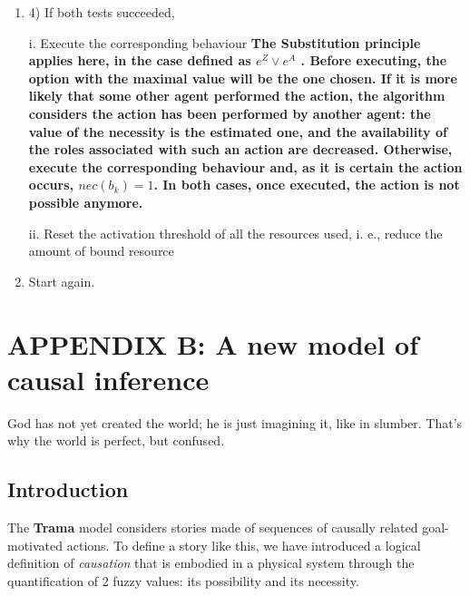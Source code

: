\documentclass[
		twoside,openright,titlepage,numbers=noenddot,manychapters,
		headinclude,%
                footinclude=false,cleardoublepage=empty,
                BCOR=5mm,
		fontsize=11pt, %
                 enabledeprecatedfontcommands]{scrreprt}
\begin{document}
\begin{enumerate}
  \item 4)	If both tests succeeded,

i.	Execute the corresponding behaviour \textbf{ The Substitution principle applies here, in the case defined as $e^Z \vee  e^{A} $ . Before executing, the option with the maximal value  will be the one chosen.  If it is more likely that some other agent performed the action, the algorithm considers the action has been performed by another agent: the value of the necessity is  the estimated one, and the availability of the roles associated with such an action are decreased. Otherwise, execute the corresponding behaviour and, as it is certain the action occurs, $nec(b_k)=1$. In both cases, once executed, the action is not possible anymore.}


ii.	Reset the activation threshold of all the resources used, i. e., reduce the amount of bound resource
  \item Start again.
\end{enumerate}




\cleardoublepage
\chapter{APPENDIX B: A new model of causal inference}
\thispagestyle{empty}
\label{appendixcauses}



\begin{origquote}
God has not yet created the world;
he is just imagining it, like in slumber.
That's why the world is perfect, but confused.
\cite{monterroso1972mp}
\end{origquote}


\section{Introduction}
The \textbf{Trama} model considers stories made of sequences of causally related goal-motivated actions. To define a story like this, we have introduced a logical definition of \emph{causation} that is embodied in a physical system through the quantification of 2 fuzzy values: its possibility and its necessity. 
\end{document}

